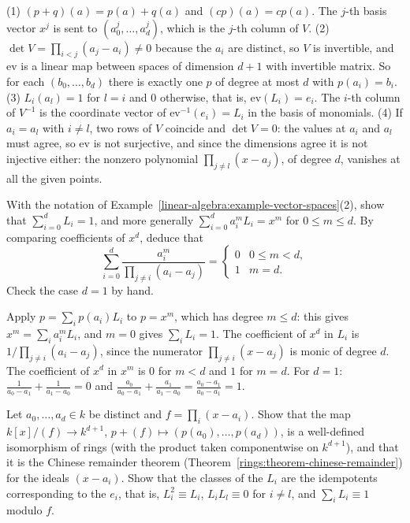 \begin{solution}
(1) $(p + q)(a) = p(a) + q(a)$ and $(cp)(a) = cp(a)$. The $j$-th basis vector $x^j$ is sent to $(a_0^j, \ldots, a_d^j)$, which is the $j$-th column of $V$. (2) $\det V = \prod_{i < j}(a_j - a_i) \neq 0$ because
the $a_i$ are distinct, so $V$ is invertible, and $\mathrm{ev}$ is a linear map between spaces of dimension $d + 1$ with invertible matrix. So for each $(b_0, \ldots, b_d)$ there is exactly one $p$ of degree at most $d$
with $p(a_i) = b_i$. (3) $L_i(a_l) = 1$ for $l = i$ and $0$ otherwise, that is, $\mathrm{ev}(L_i) = e_i$. The $i$-th column of $V^{-1}$ is the coordinate vector of $\mathrm{ev}^{-1}(e_i) = L_i$ in the basis of monomials.
(4) If $a_i = a_l$ with $i \neq l$, two rows of $V$ coincide and $\det V = 0$: the values at $a_i$ and $a_l$ must agree, so $\mathrm{ev}$ is not surjective, and since the dimensions agree it is not injective
either: the nonzero polynomial $\prod_{j \neq l}(x - a_j)$, of degree $d$, vanishes at all the given points.
\end{solution}

\begin{exercise}\label{linear-algebra:exercise-lagrange-identities}
With the notation of Example~\ref{linear-algebra:example-vector-spaces}(2), show that $\sum_{i=0}^dL_i = 1$, and more generally $\sum_{i=0}^da_i^mL_i = x^m$ for $0 \leq m \leq d$. By comparing coefficients of $x^d$, deduce that
\[
\sum_{i=0}^d\frac{a_i^m}{\prod_{j \neq i}(a_i - a_j)} = \begin{cases}0 & 0 \leq m < d,\\ 1 & m = d.\end{cases}
\]
Check the case $d = 1$ by hand.
\end{exercise}

\begin{solution}
Apply $p = \sum_ip(a_i)L_i$ to $p = x^m$, which has degree $m \leq d$: this gives $x^m = \sum_ia_i^mL_i$, and $m = 0$ gives $\sum_iL_i = 1$. The coefficient of $x^d$ in $L_i$ is $1/\prod_{j \neq i}(a_i - a_j)$, since
the numerator $\prod_{j \neq i}(x - a_j)$ is monic of degree $d$. The coefficient of $x^d$ in $x^m$ is $0$ for $m < d$ and $1$ for $m = d$. For $d = 1$: $\frac1{a_0 - a_1} + \frac1{a_1 - a_0} = 0$ and
$\frac{a_0}{a_0 - a_1} + \frac{a_1}{a_1 - a_0} = \frac{a_0 - a_1}{a_0 - a_1} = 1$.
\end{solution}

\begin{exercise}\label{linear-algebra:exercise-lagrange-crt}
Let $a_0, \ldots, a_d \in k$ be distinct and $f = \prod_i(x - a_i)$. Show that the map $k[x]/(f) \to k^{d+1}$, $p + (f) \mapsto (p(a_0), \ldots, p(a_d))$, is a well-defined isomorphism of rings (with the product
taken componentwise on $k^{d+1}$), and that it is the Chinese remainder theorem (Theorem~\ref{rings:theorem-chinese-remainder}) for the ideals $(x - a_i)$. Show that the classes of the $L_i$ are the idempotents
corresponding to the $e_i$, that is, $L_i^2 \equiv L_i$, $L_iL_l \equiv 0$ for $i \neq l$, and $\sum_iL_i \equiv 1$ modulo $f$.
\end{exercise}

